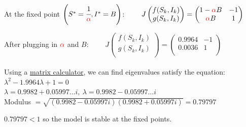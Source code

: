 \documentclass[12pt]{article}
\begin{document}
At the fixed point $\left(S^* = \cfrac{1}{\textcolor{red} {\alpha}}, I^* = B\right)$:
$\qquad J
\begin{pmatrix}
f(S_k,I_k)\\
g(S_k,I_k)\\
\end{pmatrix}
= \begin{pmatrix}
1- \textcolor{red} {\alpha} B & -1\\
\textcolor{red} {\alpha} B & 1\\
\end{pmatrix}$

After plugging in $\textcolor{red} {\alpha}$ and $B$:
$\qquad J
\begin{pmatrix}
f(S_k,I_k)\\
g(S_k,I_k)\\
\end{pmatrix}
= \begin{pmatrix}
0.9964 & -1\\
0.0036 & 1\\
\end{pmatrix}$\\\\
Using a \href{https://www.symbolab.com/solver/matrix-eigenvalues-calculator}{matrix calculator}, we can find eigenvalues satisfy the equation: $\lambda^2-1.9964\lambda+1 = 0$ \\
\hphantom{sjssfa} $\lambda = 0.9982+0.05997\dots i,\: \lambda=0.9982-0.05997\dots i$\\
Modulus $= \sqrt{(0.9982-0.05997i)(0.9982+0.05997i)} = 0.79797$
\begin{center}
$0.79797 < 1$ so the model is stable at the fixed points.
\end{center}
\end{document}
